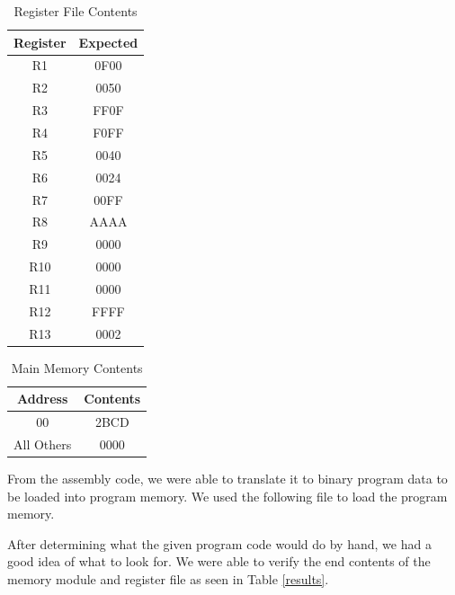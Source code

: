 	\begin{table}[htbp]
	   \caption{Register File Contents}
	   \label{regfi}
	   \centering
	   \begin{tabular}{ c | c }
	   Register         & Expected \\
	   \hline
	   R1  &   0F00        \\
       R2  &   0050        \\
       R3  &   FF0F        \\
       R4  &   F0FF        \\
       R5  &   0040        \\
       R6  &   0024        \\
       R7  &   00FF        \\
       R8  &   AAAA        \\
       R9  &   0000        \\
       R10 &   0000        \\
       R11 &   0000        \\
       R12 &   FFFF        \\
       R13 &   0002        \\
	   \end{tabular}
	\end{table}
    \begin{table}[htbp]
       \caption{Main Memory Contents}
       \label{mainme}
       \centering
       \begin{tabular}{ c | c }
       Address         & Contents   \\
       \hline
       00  &   2BCD                 \\
       All Others  &   0000         \\
       
       \end{tabular}
    \end{table}
    
    From the assembly code, we were able to translate it to binary program data 
    to be loaded into program memory. We used the following file to load the program memory.
    
    
    After determining what the given program code would do by hand, we had a good idea of
    what to look for. We were able to verify the end contents of the memory module and register file as seen in Table \ref{results}.
    
